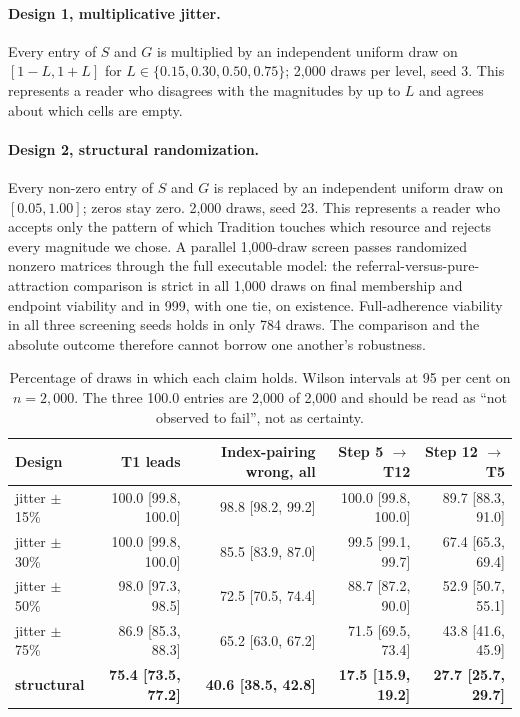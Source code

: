 \documentclass[11pt,a4paper]{article}
\begin{document}
\paragraph{Design 1, multiplicative jitter.} Every entry of $S$ and $G$ is
multiplied by an independent uniform draw on $[1-L, 1+L]$ for
$L \in \{0.15, 0.30, 0.50, 0.75\}$; 2,000 draws per level, seed 3. This represents
a reader who disagrees with the magnitudes by up to $L$ and agrees about which
cells are empty.

\paragraph{Design 2, structural randomization.} Every non-zero entry of $S$ and
$G$ is replaced by an independent uniform draw on $[0.05, 1.00]$; zeros stay zero.
2,000 draws, seed 23. This represents a reader who accepts only the pattern of
which Tradition touches which resource and rejects every magnitude we chose. A
parallel 1,000-draw screen passes randomized nonzero matrices through the full
executable model: the referral-versus-pure-attraction comparison is strict in all
1,000 draws on final membership and endpoint viability and in 999, with one tie,
on existence. Full-adherence viability in all three screening seeds holds in only
784 draws. The comparison and the absolute outcome therefore cannot borrow one
another's robustness.

\begin{table}[htbp]\centering\small
\setlength{\tabcolsep}{4pt}
\begin{tabular}{@{}lrrrr@{}}
\toprule
Design & T1 leads & Index-pairing wrong, all & Step 5 $\to$ T12 & Step 12 $\to$ T5 \\
\midrule
jitter $\pm$15\% & 100.0 [99.8, 100.0] & 98.8 [98.2, 99.2] & 100.0 [99.8, 100.0] & 89.7 [88.3, 91.0] \\
jitter $\pm$30\% & 100.0 [99.8, 100.0] & 85.5 [83.9, 87.0] & 99.5 [99.1, 99.7] & 67.4 [65.3, 69.4] \\
jitter $\pm$50\% & 98.0 [97.3, 98.5]   & 72.5 [70.5, 74.4] & 88.7 [87.2, 90.0] & 52.9 [50.7, 55.1] \\
jitter $\pm$75\% & 86.9 [85.3, 88.3]   & 65.2 [63.0, 67.2] & 71.5 [69.5, 73.4] & 43.8 [41.6, 45.9] \\
\textbf{structural} & \textbf{75.4 [73.5, 77.2]} & \textbf{40.6 [38.5, 42.8]} & \textbf{17.5 [15.9, 19.2]} & \textbf{27.7 [25.7, 29.7]} \\
\bottomrule
\end{tabular}
\caption{Percentage of draws in which each claim holds. Wilson intervals at 95 per
cent on $n = 2{,}000$. The three 100.0 entries are 2,000 of 2,000 and should be read
as ``not observed to fail'', not as certainty.}
\label{tab:coupling-robust}
\end{table}
\end{document}

